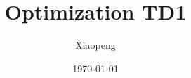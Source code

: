 \documentclass[a4paper, 12pt]{article}
\begin{document}
\title{Optimization TD1}
\author{Xiaopeng}
\date{\today}

\maketitle

\setcounter{section}{1}

\end{document}
